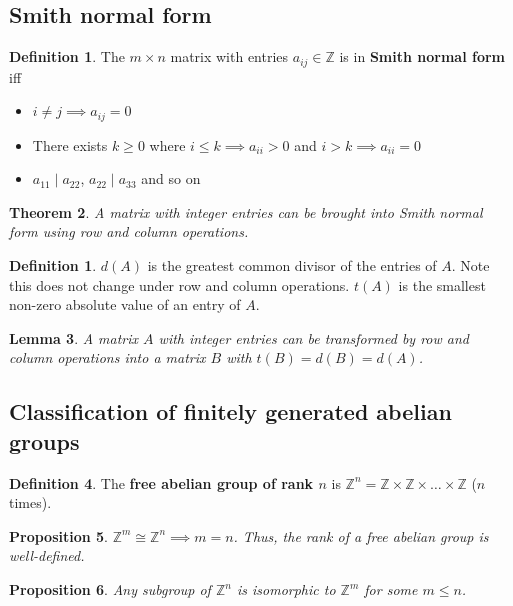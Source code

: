 \documentclass[12pt]{article}
\newtheorem{thm}{Theorem}[section]
\newtheorem{lem}[thm]{Lemma}
\newtheorem{prop}[thm]{Proposition}
\theoremstyle{definition}
\newtheorem{defn}[thm]{Definition}
\newtheorem*{defn*}{Definition}
\newcommand{\Z}{\mathbb{Z}}
\begin{document}
\subsection{Smith normal form}

\begin{defn}
  The $m \times n$ matrix with entries $a_{ij} \in \Z$ is in \textbf{Smith normal form} iff
  \begin{itemize}
    \item $i \neq j \implies a_{ij} = 0$
    \item There exists $k \geq 0$ where $i \leq k \implies a_{ii} > 0$ and $i > k \implies a_{ii} = 0$
    \item $a_{11} \mid a_{22}$, $a_{22} \mid a_{33}$ and so on
  \end{itemize}
\end{defn}

\begin{thm}
  A matrix with integer entries can be brought into Smith normal form using row and column operations.
\end{thm}

\begin{defn*}
  $d(A)$ is the greatest common divisor of the entries of $A$.
  Note this does not change under row and column operations.
  $t(A)$ is the smallest non-zero absolute value of an entry of $A$.
\end{defn*}

\begin{lem}
  A matrix $A$ with integer entries can be transformed by row and column operations into a matrix $B$ with $t(B) = d(B) = d(A)$.
\end{lem}

\subsection{Classification of finitely generated abelian groups}

\begin{defn}
  The \textbf{free abelian group of rank $n$} is $\Z^n = \Z \times \Z \times \ldots \times \Z$ ($n$ times).
\end{defn}

\begin{prop}
  $\Z^m \cong \Z^n \implies m = n$.
  Thus, the rank of a free abelian group is well-defined.
\end{prop}

\begin{prop}
  Any subgroup of $\Z^n$ is isomorphic to $\Z^m$ for some $m \leq n$.
\end{prop}
\end{document}
